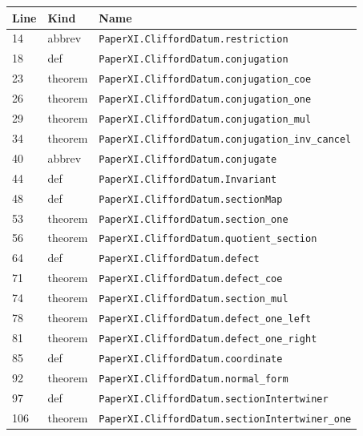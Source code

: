 \documentclass[10pt,oneside]{book}
\begin{document}
\begin{longtable}{@{}p{}p{}p{}@{}}\toprule Line&Kind&Name\\\midrule\endhead

14&abbrev&\nolinkurl{PaperXI.CliffordDatum.restriction}\\

18&def&\nolinkurl{PaperXI.CliffordDatum.conjugation}\\

23&theorem&\nolinkurl{PaperXI.CliffordDatum.conjugation_coe}\\

26&theorem&\nolinkurl{PaperXI.CliffordDatum.conjugation_one}\\

29&theorem&\nolinkurl{PaperXI.CliffordDatum.conjugation_mul}\\

34&theorem&\nolinkurl{PaperXI.CliffordDatum.conjugation_inv_cancel}\\

40&abbrev&\nolinkurl{PaperXI.CliffordDatum.conjugate}\\

44&def&\nolinkurl{PaperXI.CliffordDatum.Invariant}\\

48&def&\nolinkurl{PaperXI.CliffordDatum.sectionMap}\\

53&theorem&\nolinkurl{PaperXI.CliffordDatum.section_one}\\

56&theorem&\nolinkurl{PaperXI.CliffordDatum.quotient_section}\\

64&def&\nolinkurl{PaperXI.CliffordDatum.defect}\\

71&theorem&\nolinkurl{PaperXI.CliffordDatum.defect_coe}\\

74&theorem&\nolinkurl{PaperXI.CliffordDatum.section_mul}\\

78&theorem&\nolinkurl{PaperXI.CliffordDatum.defect_one_left}\\

81&theorem&\nolinkurl{PaperXI.CliffordDatum.defect_one_right}\\

85&def&\nolinkurl{PaperXI.CliffordDatum.coordinate}\\

92&theorem&\nolinkurl{PaperXI.CliffordDatum.normal_form}\\

97&def&\nolinkurl{PaperXI.CliffordDatum.sectionIntertwiner}\\

106&theorem&\nolinkurl{PaperXI.CliffordDatum.sectionIntertwiner_one}\\

\bottomrule\end{longtable}
\end{document}
